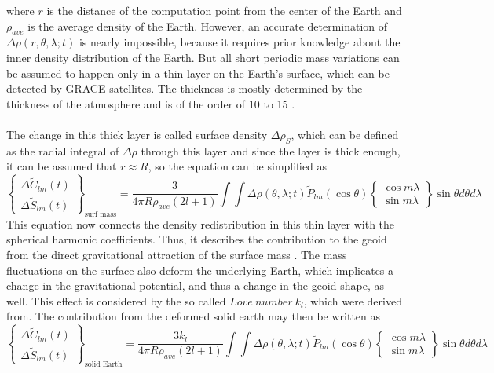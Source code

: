 where $r$ is the distance of the computation point from the center of the Earth and $\rho_{ave}$ is the average density of the Earth. However, an accurate determination of $\Delta \rho(r,\theta,\lambda;t)$ is nearly impossible, because it requires prior knowledge about the inner density distribution of the Earth. But all short periodic mass variations can be assumed to happen only in a thin layer on the Earth's surface, which can be detected by GRACE satellites. The thickness is mostly determined by the thickness of the atmosphere and is of the order of 10 to 15  \cite{wahr1998time}. \\\\
The change in this thick layer is called surface density $\Delta \rho_{S}$, which can be defined as the radial integral of $\Delta \rho$ through this layer and since the layer is thick enough, it can be assumed that $r \approx R$, so the equation can be simplified as
\begin{equation}
\begin{Bmatrix}
\Delta \tilde{C}_{lm}(t)\\
\Delta \tilde{S}_{lm}(t)
\end{Bmatrix}_{\text{surf mass}} = \frac{3}{4\pi R \rho_{ave}(2l+1)} \int \int \Delta \rho(\theta,\lambda;t) \tilde{P}_{lm}(\cos \theta)  
\begin{Bmatrix}
\cos m\lambda \\
\sin m\lambda
\end{Bmatrix} \sin\theta d\theta d\lambda
\end{equation}
This equation now connects the density redistribution in this thin layer with the spherical harmonic coefficients. Thus, it describes the contribution to the geoid from the direct gravitational attraction of the surface mass \cite{wahr1998time}. The mass fluctuations on the surface also deform the underlying Earth, which implicates a change in the gravitational potential, and thus a change in the geoid shape, as well. This effect is considered by the so called $Love\ number\ k_{l}$, which were derived from\cite{han1995viscoelastic}. The contribution from the deformed solid earth may then be written as
\begin{equation}
\begin{Bmatrix}
\Delta \tilde{C}_{lm}(t)\\
\Delta \tilde{S}_{lm}(t)
\end{Bmatrix}_{\text{solid Earth}} = \frac{3k_{l}}{4\pi R \rho_{ave}(2l+1)} \int \int \Delta \rho(\theta,\lambda;t) \tilde{P}_{lm}(\cos \theta) 
\begin{Bmatrix}
\cos m\lambda \\
\sin m\lambda
\end{Bmatrix} \sin\theta d\theta d\lambda
\end{equation}
